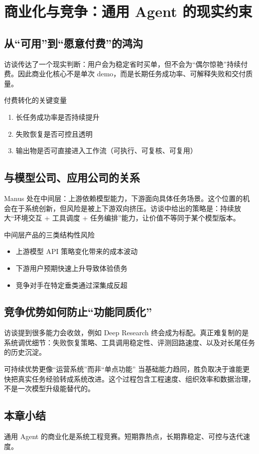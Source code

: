 \section{商业化与竞争：通用 Agent 的现实约束}

\subsection{从“可用”到“愿意付费”的鸿沟}

访谈传达了一个现实判断：用户会为稳定省时买单，但不会为“偶尔惊艳”持续付费。因此商业化核心不是单次 demo，而是长期任务成功率、可解释失败和交付质量。

\begin{importantbox}{付费转化的关键变量}
\begin{enumerate}
    \item 长任务成功率是否持续提升
    \item 失败恢复是否可控且透明
    \item 输出物是否可直接进入工作流（可执行、可复核、可复用）
\end{enumerate}
\end{importantbox}

\subsection{与模型公司、应用公司的关系}

Manus 处在中间层：上游依赖模型能力，下游面向具体任务场景。这个位置的机会在于系统创新，但风险是被上下游双向挤压。访谈中给出的策略是：持续放大“环境交互 + 工具调度 + 任务编排”能力，让价值不等同于某个模型版本。

\begin{warningbox}{中间层产品的三类结构性风险}
\begin{itemize}
    \item 上游模型 API 策略变化带来的成本波动
    \item 下游用户预期快速上升导致体验债务
    \item 竞争对手在特定垂类通过深集成反超
\end{itemize}
\end{warningbox}

\subsection{竞争优势如何防止“功能同质化”}

访谈提到很多能力会收敛，例如 Deep Research 终会成为标配。真正难复制的是系统调优细节：失败恢复策略、工具调用稳定性、评测回路速度、以及对长尾任务的历史沉淀。

\begin{knowledgebox}{可持续优势更像“运营系统”而非“单点功能”}
当基础能力趋同，胜负取决于谁能更快把真实任务经验转成系统改进。这个过程包含工程速度、组织效率和数据治理，不是一次模型升级能替代的。
\end{knowledgebox}

\subsection{本章小结}

通用 Agent 的商业化是系统工程竞赛。短期靠热点，长期靠稳定、可控与迭代速度。


